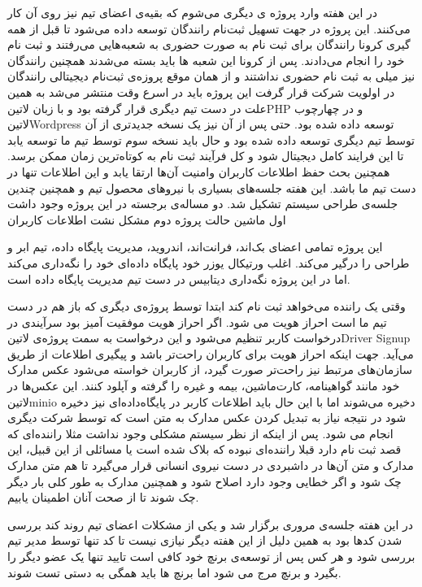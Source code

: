 \documentclass[a4]{report}
\begin{document}
در این هفته وارد پروژه ی دیگری می‌شوم که بقیه‌ی اعضای تیم نیز روی آن کار می‌کنند.
این پروژه در جهت تسهیل ثبت‌نام رانندگان توسعه داده می‌شود تا قبل از همه گیری کرونا رانندگان برای ثبت نام به صورت حضوری به شعبه‌هایی می‌رفتند و ثبت نام خود را انجام می‌دادند.
پس از کرونا این شعبه ها باید بسته می‌شدند همچنین رانندگان نیز میلی به ثبت نام حضوری نداشتند و از همان موقع پروزه‌ی ثبت‌نام دیجیتالی رانندگان در اولویت شرکت قرار گرفت این پروژه باید در اسرع وقت منتشر می‌شد
به همین علت در دست تیم دیگری قرار گرفته بود و با زبان ‌لاتین{PHP} و در چهارچوب ‌لاتین{Wordpress} توسعه داده شده بود.
حتی پس از آن نیز یک نسخه جدیدتری از آن توسط تیم دیگری توسعه داده شده بود و حال باید نسخه سوم توسط تیم ما توسعه یابد تا این فرایند کامل دیجیتال شود و کل فرآیند ثبت نام به کوتاه‌ترین زمان ممکن برسد.
همچنین بحث حفظ اطلاعات کاربران وامنیت آن‌ها ارتقا یابد و این اطلاعات تنها در دست تیم ما باشد.
این هفته جلسه‌های بسیاری با نیروهای محصول تیم و همچنین چندین جلسه‌ی طراحی سیستم تشکیل شد. دو مساله‌ی برجسته در این پروژه وجود داشت اول ماشین حالت پروژه دوم مشکل نشت اطلاعات کاربران

این پروژه تمامی اعضای بک‌اند، فرانت‌اند، اندروید، مدیریت پایگاه داده، تیم ابر و طراحی را درگیر می‌کند. اغلب ورتیکال یوزر خود پایگاه داده‌ای‌ خود را نگه‌داری می‌کند اما در این پروژه نگه‌داری دیتابیس در دست تیم مدیریت پایگاه داده است.

وقتی یک راننده می‌خواهد ثبت نام کند ابتدا توسط پروژه‌ی دیگری که باز هم در دست تیم ما است احراز هویت می شود.
اگر احراز هویت موفقیت آمیز بود سرآیندی در درخواست کاربر تنظیم می‌شود و این درخواست به سمت پروژه‌ی ‌لاتین{Driver Signup} می‌آید.
جهت اینکه احراز هویت برای کاربران راحت‌تر باشد و پیگیری اطلاعات از طریق سازمان‌های مرتبط نیز راحت‌تر صورت گیرد، از کاربران خواسته می‌شود عکس مدارک خود مانند گواهینامه، کارت‌ماشین، بیمه و غیره را گرفته و آپلود کنند.
این عکس‌ها در ‌لاتین{minio} دخیره می‌شوند اما با این حال باید اطلاعات کاربر در پایگاه‌داده‌ای نیز دخیره شود در نتیجه نیاز به تبدیل کردن عکس مدارک به متن است که توسط شرکت دیگری انجام می شود.
پس از اینکه از نظر سیستم مشکلی وجود نداشت مثلا راننده‌ای که قصد ثبت نام دارد قبلا راننده‌ای نبوده که بلاک شده است یا مسائلی از این قبیل،
این مدارک و متن آن‌ها در داشبردی در دست نیروی انسانی قرار می‌گیرد تا هم متن مدارک چک شود و اگر خطایی وجود دارد اصلاح شود و همچنین مدارک به طور کلی بار دیگر چک شوند تا از صحت آنان اطمینان یابیم.

در این هفته جلسه‌ی مروری برگزار شد و یکی از مشکلات اعضای تیم روند کند بررسی شدن کدها بود به همین دلیل از این هفته دیگر نیازی نیست تا کد تنها توسط مدیر تیم بررسی شود
و هر کس پس از توسعه‌ی برنچ خود کافی است تایید تنها یک عضو دیگر را بگیرد و برنچ مرج می شود اما برنچ ها باید همگی به دستی تست شوند.
\end{document}
